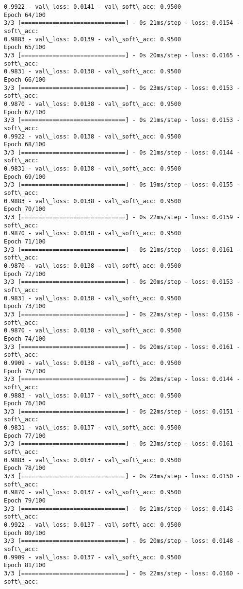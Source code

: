 \documentclass[11pt]{article}
\begin{document}
\begin{Verbatim}[commandchars=\\\{\}]
0.9922 - val\_loss: 0.0141 - val\_soft\_acc: 0.9500
Epoch 64/100
3/3 [==============================] - 0s 21ms/step - loss: 0.0154 - soft\_acc:
0.9883 - val\_loss: 0.0139 - val\_soft\_acc: 0.9500
Epoch 65/100
3/3 [==============================] - 0s 20ms/step - loss: 0.0165 - soft\_acc:
0.9831 - val\_loss: 0.0138 - val\_soft\_acc: 0.9500
Epoch 66/100
3/3 [==============================] - 0s 23ms/step - loss: 0.0153 - soft\_acc:
0.9870 - val\_loss: 0.0138 - val\_soft\_acc: 0.9500
Epoch 67/100
3/3 [==============================] - 0s 21ms/step - loss: 0.0153 - soft\_acc:
0.9922 - val\_loss: 0.0138 - val\_soft\_acc: 0.9500
Epoch 68/100
3/3 [==============================] - 0s 21ms/step - loss: 0.0144 - soft\_acc:
0.9831 - val\_loss: 0.0138 - val\_soft\_acc: 0.9500
Epoch 69/100
3/3 [==============================] - 0s 19ms/step - loss: 0.0155 - soft\_acc:
0.9883 - val\_loss: 0.0138 - val\_soft\_acc: 0.9500
Epoch 70/100
3/3 [==============================] - 0s 22ms/step - loss: 0.0159 - soft\_acc:
0.9870 - val\_loss: 0.0138 - val\_soft\_acc: 0.9500
Epoch 71/100
3/3 [==============================] - 0s 21ms/step - loss: 0.0161 - soft\_acc:
0.9870 - val\_loss: 0.0138 - val\_soft\_acc: 0.9500
Epoch 72/100
3/3 [==============================] - 0s 20ms/step - loss: 0.0153 - soft\_acc:
0.9831 - val\_loss: 0.0138 - val\_soft\_acc: 0.9500
Epoch 73/100
3/3 [==============================] - 0s 22ms/step - loss: 0.0158 - soft\_acc:
0.9870 - val\_loss: 0.0138 - val\_soft\_acc: 0.9500
Epoch 74/100
3/3 [==============================] - 0s 20ms/step - loss: 0.0161 - soft\_acc:
0.9909 - val\_loss: 0.0138 - val\_soft\_acc: 0.9500
Epoch 75/100
3/3 [==============================] - 0s 20ms/step - loss: 0.0144 - soft\_acc:
0.9883 - val\_loss: 0.0137 - val\_soft\_acc: 0.9500
Epoch 76/100
3/3 [==============================] - 0s 22ms/step - loss: 0.0151 - soft\_acc:
0.9831 - val\_loss: 0.0137 - val\_soft\_acc: 0.9500
Epoch 77/100
3/3 [==============================] - 0s 23ms/step - loss: 0.0161 - soft\_acc:
0.9883 - val\_loss: 0.0137 - val\_soft\_acc: 0.9500
Epoch 78/100
3/3 [==============================] - 0s 23ms/step - loss: 0.0150 - soft\_acc:
0.9870 - val\_loss: 0.0137 - val\_soft\_acc: 0.9500
Epoch 79/100
3/3 [==============================] - 0s 21ms/step - loss: 0.0143 - soft\_acc:
0.9922 - val\_loss: 0.0137 - val\_soft\_acc: 0.9500
Epoch 80/100
3/3 [==============================] - 0s 20ms/step - loss: 0.0148 - soft\_acc:
0.9909 - val\_loss: 0.0137 - val\_soft\_acc: 0.9500
Epoch 81/100
3/3 [==============================] - 0s 22ms/step - loss: 0.0160 - soft\_acc:

\end{Verbatim}
\end{document}
